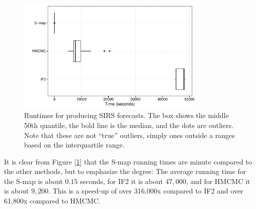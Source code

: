     \begin{figure}
        \centering
        \captionsetup{width=.8\linewidth}
        \includegraphics[width=0.8\textwidth]{./images/timeplot.pdf}
        \caption{Runtimes for producing SIRS forecasts. The box shows the middle 50th quantile, the bold line is the median, and the dots are outliers. Note that these are not ``true'' outliers, simply ones outside a ranges based on the interquartile range. \label{sirstimeplot}}
    \end{figure}

    It is clear from Figure [\ref{sirstimeplot}] that the S-map running times are minute compared to the other methods, but to emphasize the degree: The average running time for the S-map is about $0.15$ seconds, for IF2 it is about $47,000$, and for HMCMC it is about $9,200$. This is a speed-up of over 316,000x compared to IF2 and over 61,800x compared to HMCMC.
